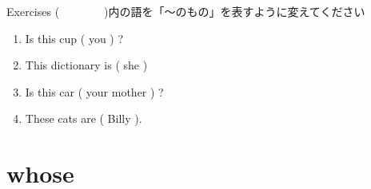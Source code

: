 \documentclass[aspectratio=169,xcolor={dvipsnames,table}]{beamer}
\begin{document}
\begin{frame}[plain]{Exercises}
(~~~~~~~~)内の語を「〜のもの」を表すように変えてください
 \begin{enumerate}
  \item Is this cup ( you ) ?\hfill{}
  \item This dictionary is ( she )\hfill{}
  \item Is this car ( your mother ) ?\hfill{}
  \item These cats are ( Billy ).\hfill{}
 \end{enumerate}

\hfill{\scriptsize {}}

\end{frame}


\section{whose }
\end{document}

